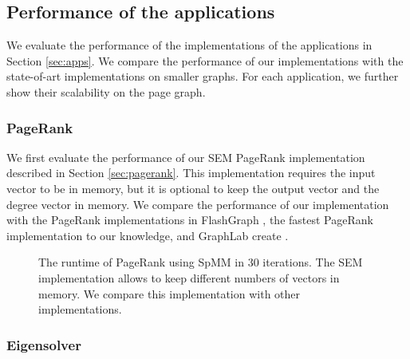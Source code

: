 %		
%		

\subsection{Performance of the applications}

We evaluate the performance of the implementations of the applications in
Section \ref{sec:apps}. We compare the performance of our implementations
with the state-of-art implementations on smaller graphs. For each application,
we further show their scalability on the page graph.

\subsubsection{PageRank}
We first evaluate the performance of our SEM PageRank implementation described
in Section \ref{sec:pagerank}. This implementation requires the input vector
to be in memory, but it is optional to keep the output vector and the degree
vector in memory. We compare the performance of our implementation with
the PageRank implementations in FlashGraph \cite{flashgraph}, the fastest PageRank
implementation to our knowledge, and GraphLab create \cite{}.


\begin{figure}
	\begin{center}
		\footnotesize
		
		\caption{The runtime of PageRank using SpMM in 30 iterations. The SEM
			implementation allows to keep different numbers of vectors in memory.
			We compare this implementation with other implementations.}
		\label{perf:pagerank}
	\end{center}
\end{figure}

\subsubsection{Eigensolver}

